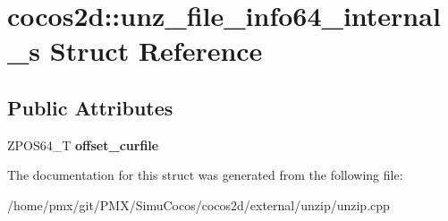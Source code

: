 \hypertarget{structcocos2d_1_1unz__file__info64__internal__s}{}\section{cocos2d\+:\+:unz\+\_\+file\+\_\+info64\+\_\+internal\+\_\+s Struct Reference}
\label{structcocos2d_1_1unz__file__info64__internal__s}
\subsection*{Public Attributes}
\begin{DoxyCompactItemize}
\item 
\mbox{\label{structcocos2d_1_1unz__file__info64__internal__s_adda5df4bc6d371cb0e86f081fae7a418}} 
Z\+P\+O\+S64\+\_\+T {\bfseries offset\+\_\+curfile}
\end{DoxyCompactItemize}


The documentation for this struct was generated from the following file\+:\begin{DoxyCompactItemize}
\item 
/home/pmx/git/\+P\+M\+X/\+Simu\+Cocos/cocos2d/external/unzip/unzip.\+cpp\end{DoxyCompactItemize}
